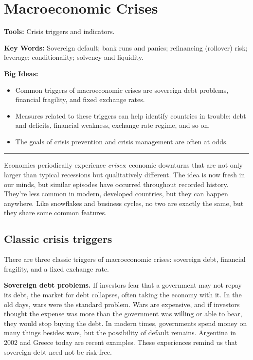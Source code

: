 \chapter{Macroeconomic Crises}\label{chp:cris}
\hypertarget{crises}{}

\textbf{Tools:} Crisis triggers and indicators.

\textbf{Key Words:} Sovereign default; bank runs and panics; refinancing (rollover) risk; leverage; conditionality;
solvency and liquidity.

\textbf{Big Ideas:}
\vspace{-0.1in}
\begin{itemize}
\item Common triggers of macroeconomic crises are sovereign debt problems, financial fragility,
and fixed exchange rates.

\item Measures related to these triggers can help identify countries in trouble:
debt and deficits, financial weakness, exchange rate regime, and so on.

\item The goals of crisis prevention and crisis management are often at odds.
\end{itemize}
\rule{\textwidth}{1pt}

Economies periodically experience {\it crises\/}:
economic downturns that are not only larger than typical recessions
but qualitatively different.
The idea is now fresh in our minds,
but similar episodes have occurred throughout recorded history.
They're less common in modern, developed countries,
but they can happen anywhere.
Like snowflakes and business cycles, no two are exactly the same,
but they share some common features.


\section{Classic crisis triggers}

There are three classic triggers of macroeconomic crises:
sovereign debt, financial fragility, and a fixed exchange rate.

\textbf{Sovereign debt problems.}
If investors fear that a government may not repay its debt,
the market for debt collapses, often taking the economy with it.
In the old days, wars were the standard problem.
Wars are expensive, and if investors thought the expense was more
than the government was willing or able to bear,
they would stop buying the debt.
In modern times, governments spend money on many things besides wars,
but the possibility of default remains.
Argentina in 2002 and Greece today are recent examples.
These experiences remind us that sovereign debt need not be risk-free.

